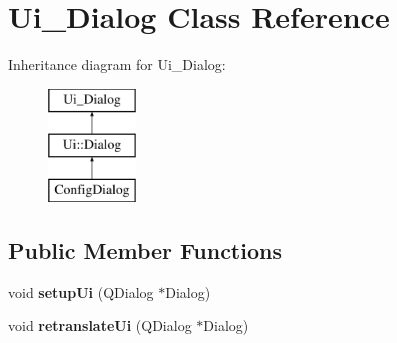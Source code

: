 \hypertarget{class_ui___dialog}{
\section{Ui\_\-Dialog Class Reference}
\label{class_ui___dialog}
}
Inheritance diagram for Ui\_\-Dialog:\begin{figure}[H]
\begin{center}
\leavevmode
\includegraphics[height=3.000000cm]{class_ui___dialog}
\end{center}
\end{figure}
\subsection*{Public Member Functions}
\begin{DoxyCompactItemize}
\item 
\hypertarget{class_ui___dialog_a4f6a478c3ecdafabffb17b39cb26444a}{
void {\bfseries setupUi} (QDialog $\ast$Dialog)}
\label{class_ui___dialog_a4f6a478c3ecdafabffb17b39cb26444a}

\item 
\hypertarget{class_ui___dialog_afa0ccb6f716ca6178260522a193c250e}{
void {\bfseries retranslateUi} (QDialog $\ast$Dialog)}
\label{class_ui___dialog_afa0ccb6f716ca6178260522a193c250e}

\end{DoxyCompactItemize}
